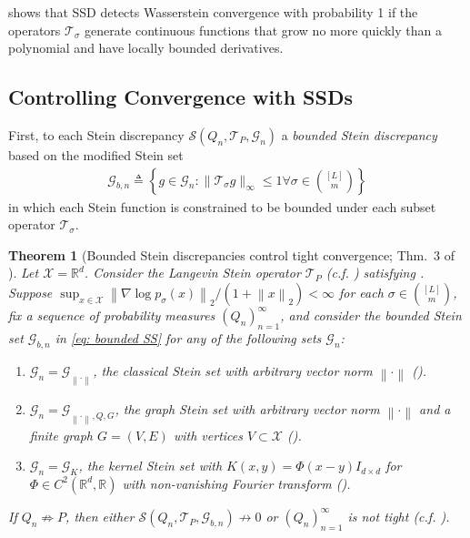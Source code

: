 \documentclass[12pt,paper=letter]{scrreprt}
\newtheorem{theorem}{Theorem}[chapter]
\def\defeq{\triangleq} %
\def\norm#1{\left\|{#1}\right\|} %
\newcommand{\twonorm}[1]{\norm{#1}_2} %
\newcommand{\grad}{\nabla} %
\newcommand{\xset}[0]{\mathcal{X}} %
\newcommand{\gset}[0]{\mathcal{G}} %
\newcommand{\steinset}[0]{\steinsetarg{}} %
\newcommand{\steinsetarg}[1]{\gset_{\norm{\cdot}_{#1}}} %
\newcommand{\gsteinset}[2]{\gset_{\norm{\cdot}_{#1},Q,{#2}}} %
\newcommand{\sset}{\sigma} %
\newcommand{\equisubs}[2]{{[#1]\choose #2}}
\newcommand{\langevin}{\mathcal{T}_P} %
\newcommand{\stein}[3]{\mathcal{S}({#1},{#2},{#3})} %
\newcommand{\langstein}[2]{\stein{#1}{\langevin{}}{#2}} %
\begin{document}
\noindent {} shows that SSD detects Wasserstein convergence with probability 1 if the operators $\mathcal{T}_\sigma$ generate continuous functions that grow no more quickly than a polynomial and have locally bounded derivatives. 



 

\subsection{Controlling Convergence with SSDs}
\label{subsec: SSD control}


First, to each Stein discrepancy $\mathcal{S}(Q_n,\mathcal{T}_P,\mathcal{G}_n)$ a \emph{bounded Stein discrepancy} based on the modified Stein set
\begin{align}
    \mathcal{G}_{b,n} \defeq \left\{g \in \mathcal{G}_n : \|\mathcal{T}_\sigma g\|_\infty \leq 1 \forall \sigma \in {\textstyle \equisubs{L}{m} } \right\} \label{eq: bounded SS}
\end{align}
in which each Stein function is constrained to be bounded under each subset operator $\mathcal{T}_\sigma$.

\begin{theorem}[Bounded Stein discrepancies control tight convergence; Thm.~3 of \citealp{gorham2020stochastic}]
\label{bounded-sds-detect-tight-non-convergence}
Let $\mathcal{X} = \mathbb{R}^d$.
Consider the Langevin Stein operator $\langevin{}$ (c.f. ) satisfying .
Suppose $\sup_{x\in\xset}{\twonorm{\grad\log p_{\sset}(x)}}{/(1 + \twonorm{x})} < \infty$ for each $\sset\in\equisubs{L}{m}$, fix a sequence of probability measures $(Q_n)_{n=1}^\infty$, 
and 
consider the bounded Stein set 
$\gset_{b,n}$ in \eqref{eq: bounded SS}
for any of the following sets $\gset_n$:
\begin{enumerate}[label=(\textbf{A.\arabic*})]
    \item\label{classical-set} $\gset_n = \steinset$, the classical Stein set with arbitrary vector norm $\norm{\cdot}$ ().
    \item\label{graph-set}
    $\gset_n = \gsteinset{}{G}$, the graph Stein set with arbitrary vector norm $\norm{\cdot}$ and a finite graph $G = (V,E)$ with vertices $V \subset \xset$ ().  
    \item \label{kernel-set} $\gset_n = \mathcal{G}_K$, the kernel Stein set with $K(x,y) = \Phi(x-y) I_{d \times d}$ for $\Phi \in C^2(\mathbb{R}^d , \mathbb{R})$ with non-vanishing Fourier transform ().
\end{enumerate}
If $Q_n \not\Rightarrow P$, then either $\langstein{Q_n}{\gset_{b,n}}\not\to 0$ or $(Q_n)_{n=1}^\infty$ is not tight (c.f. ).
\end{theorem}
\end{document}
